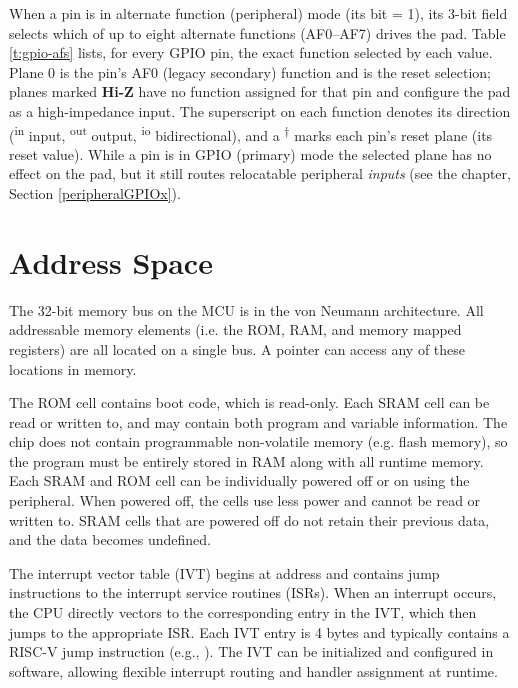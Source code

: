 \documentclass[11pt,pdftex,portrait,letterpaper]{article}
\begin{document}
When a pin is in alternate function (peripheral) mode (its  bit = 1), its 3-bit  field selects which of up to eight alternate functions (AF0--AF7) drives the pad. Table \ref{t:gpio-afs} lists, for every GPIO pin, the exact function selected by each  value. Plane 0 is the pin's AF0 (legacy secondary) function and is the reset selection; planes marked \textbf{Hi-Z} have no function assigned for that pin and configure the pad as a high-impedance input. The superscript on each function denotes its direction (\textsuperscript{\scriptsize in} input, \textsuperscript{\scriptsize out} output, \textsuperscript{\scriptsize io} bidirectional), and a \textsuperscript{$\dagger$} marks each pin's reset plane (its  reset value). While a pin is in GPIO (primary) mode the selected plane has no effect on the pad, but it still routes relocatable peripheral \emph{inputs} (see the  chapter, Section \ref{peripheralGPIOx}).



\newpage



\section{Address Space} \label{s:addressSpace}
\resizebox{!}{0.75\height}{}

The 32-bit memory bus on the MCU is in the von Neumann architecture. All addressable memory elements (i.e. the ROM, RAM, and memory mapped registers) are all located on a single bus. A pointer can access any of these locations in memory.

The ROM cell contains boot code, which is read-only. Each SRAM cell can be read or written to, and may contain both program and variable information. The chip does not contain programmable non-volatile memory (e.g. flash memory), so the program must be entirely stored in RAM along with all runtime memory. Each SRAM and ROM cell can be individually powered off or on using the  peripheral. When powered off, the cells use less power and cannot be read or written to. SRAM cells that are powered off do not retain their previous data, and the data becomes undefined.


The interrupt vector table (IVT) begins at address \texttt{\VectorsStartAddress} and contains jump instructions to the interrupt service routines (ISRs). When an interrupt occurs, the CPU directly vectors to the corresponding entry in the IVT, which then jumps to the appropriate ISR. Each IVT entry is 4 bytes and typically contains a RISC-V jump instruction (e.g., ). The IVT can be initialized and configured in software, allowing flexible interrupt routing and handler assignment at runtime.
\end{document}
